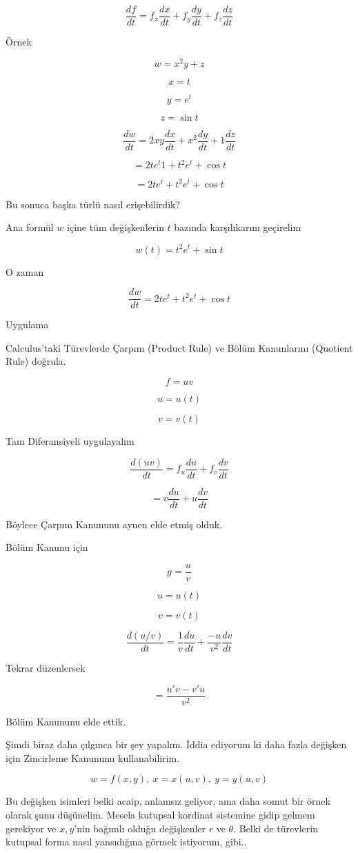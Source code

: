 \documentclass[12pt,fleqn]{article}\usepackage{../../common}
\begin{document}
$$ \frac{df}{dt} = f_x\frac{dx}{dt} + f_y\frac{dy}{dt} + f_z\frac{dz}{dt} $$

Örnek

$$ w = x^2y + z $$

$$ x = t $$

$$ y = e^t $$

$$ z = \sin t $$

$$ \frac{dw}{dt} = 2xy \frac{dx}{dt} + x^2 \frac{dy}{dt} + 1 \frac{dz}{dt}$$

$$ = 2te^t 1 + t^2e^t+\cos t $$

$$ = 2te^t + t^2e^t+\cos t $$

Bu sonuca başka türlü nasıl erişebilirdik? 

Ana formül $w$ içine tüm değişkenlerin $t$ bazında karşılıkarını geçirelim

$$ w(t) = t^2e^t + \sin t $$

O zaman

$$ \frac{dw}{dt} = 2te^t + t^2e^t + \cos t $$

Uygulama

Calculus'taki Türevlerde Çarpım (Product Rule) ve Bölüm Kanunlarını
(Quotient Rule) doğrula.

$$ f = uv $$

$$ u=u(t) $$

$$ v=v(t) $$

Tam Diferansiyeli uygulayalım

$$ \frac{d(uv)}{dt} = f_u\frac{du}{dt} + f_v \frac{dv}{dt}$$

$$  = v\frac{du}{dt} + u \frac{dv}{dt}$$

Böylece Çarpım Kanununu aynen elde etmiş olduk. 

Bölüm Kanunu için

$$ g = \frac{u}{v} $$

$$ u=u(t) $$

$$ v=v(t) $$

$$ \frac{d(u/v)}{dt} = \frac{1}{v} \frac{du}{dt} + \frac{-u}{v^2}\frac{dv}{dt}$$

Tekrar düzenlersek

$$ = \frac{u'v - v'u}{v^2} $$

Bölüm Kanununu elde ettik.

Şimdi biraz daha çılgınca bir şey yapalım. İddia ediyorum ki daha fazla
değişken için Zincirleme Kanununu kullanabilirim. 

$$ w = f(x,y), \ x = x(u,v), \ y = y(u,v) $$

Bu değişken isimleri belki acaip, anlamsız geliyor, ama daha somut bir
örnek olarak şunu düşünelim. Mesela kutupsal kordinat sistemine gidip
gelmem gerekiyor ve $x,y$'nin bağımlı olduğu değişkenler $r$ ve
$\theta$. Belki de türevlerin kutupsal forma nasıl yansıdığına görmek
istiyorum, gibi..
\end{document}
